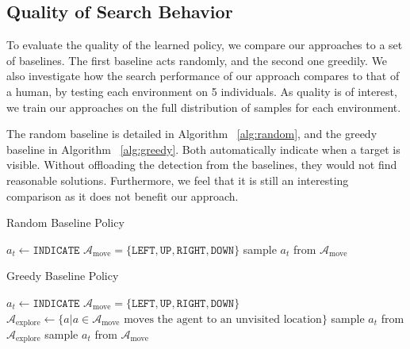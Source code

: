 \subsection{Quality of Search Behavior}

To evaluate the quality of the learned policy, we compare our approaches to a set of baselines.
The first baseline acts randomly, and the second one greedily.
We also investigate how the search performance of our approach compares to that of a human, by testing each environment on 5 individuals.
As quality is of interest, we train our approaches on the full distribution of samples for each environment.

The random baseline is detailed in Algorithm ~\ref{alg:random}, and the greedy baseline in Algorithm ~\ref{alg:greedy}.
Both automatically indicate when a target is visible.
Without offloading the detection from the baselines, they would not find reasonable solutions.
Furthermore, we feel that it is still an interesting comparison as it does not benefit our approach.

\begin{algorithm}
    \label{alg:random}
    \caption{Random Baseline Policy}
    \begin{algorithmic}
            \State \(a_t \leftarrow \mathtt{INDICATE}\)
        \Else
            \State \(\mathcal{A}_{\text{move}} = \{\mathtt{LEFT}, \mathtt{UP}, \mathtt{RIGHT}, \mathtt{DOWN}\}\)
            \State sample \(a_t\) from \(\mathcal{A}_{\text{move}}\)
        \EndIf
    \end{algorithmic}
\end{algorithm}

\begin{algorithm}
    \label{alg:greedy}
    \caption{Greedy Baseline Policy}
    \begin{algorithmic}
            \State \(a_t \leftarrow \mathtt{INDICATE}\)
        \Else
            \State \(\mathcal{A}_{\text{move}} = \{\mathtt{LEFT}, \mathtt{UP}, \mathtt{RIGHT}, \mathtt{DOWN}\}\)
            \State \(\mathcal{A}_{\text{explore}} \leftarrow \{a | a \in \mathcal{A}_{\text{move}} \text{ moves the agent to an unvisited location}\}\) 
                \State sample \(a_t\) from \(\mathcal{A}_{\text{explore}}\)
            \Else
                \State sample \(a_t\) from \(\mathcal{A}_{\text{move}}\)
            \EndIf
        \EndIf
    \end{algorithmic}
\end{algorithm}

